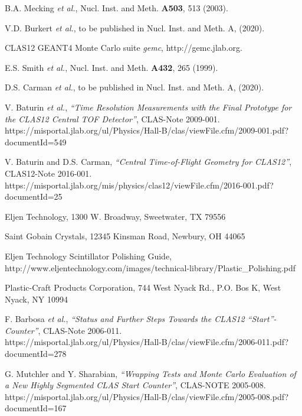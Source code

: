 \documentclass{elsart}
\begin{document}
\begin{thebibliography}{99}

B.A. Mecking {\it et al.}, Nucl. Inst. and Meth. {\bf A503}, 513 (2003).

V.D. Burkert {\it et al.}, to be published in Nucl. Inst. and Meth. A, (2020).
  
CLAS12 GEANT4 Monte Carlo suite {\it gemc}, http://gemc.jlab.org.

E.S. Smith {\it et al.}, Nucl. Inst. and Meth. {\bf A432}, 265 (1999).

D.S. Carman {\it et al.}, to be published in Nucl. Inst. and Meth. A, (2020).

V. Baturin {\it et al.}, {\it ``Time Resolution Measurements with the Final Prototype for the 
CLAS12 Central TOF Detector''}, CLAS-Note 2009-001.\\
https://misportal.jlab.org/ul/Physics/Hall-B/clas/viewFile.cfm/2009-001.pdf?documentId=549

V. Baturin and D.S. Carman, {\it ``Central Time-of-Flight Geometry for CLAS12''}, CLAS12-Note 
2016-001.\\
https://misportal.jlab.org/mis/physics/clas12/viewFile.cfm/2016-001.pdf?documentId=25

Eljen Technology, 1300 W. Broadway, Sweetwater, TX 79556

Saint Gobain Crystals, 12345 Kinsman Road, Newbury, OH 44065

Eljen Technology Scintillator Polishing Guide,\\
http://www.eljentechnology.com/images/technical-library/Plastic\_Polishing.pdf

Plastic-Craft Products Corporation, 744 West Nyack Rd., P.O. Bos K, West Nyack, NY 10994

F. Barbosa {\it et al.}, {\it ``Status and Further Steps Towards the CLAS12 ``Start''-Counter''},
CLAS-Note 2006-011.\\
https://misportal.jlab.org/ul/Physics/Hall-B/clas/viewFile.cfm/2006-011.pdf?documentId=278

G. Mutchler and Y. Sharabian, {\it ``Wrapping Tests and Monte Carlo Evaluation of a New Highly 
Segmented CLAS Start Counter''}, CLAS-NOTE 2005-008.\\
https://misportal.jlab.org/ul/Physics/Hall-B/clas/viewFile.cfm/2005-008.pdf?documentId=167


\end{thebibliography}
\end{document}
